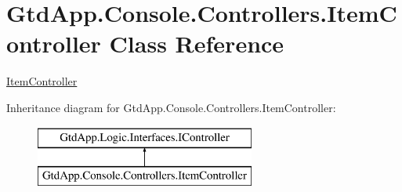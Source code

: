 \hypertarget{class_gtd_app_1_1_console_1_1_controllers_1_1_item_controller}{}\section{Gtd\+App.\+Console.\+Controllers.\+Item\+Controller Class Reference}
\label{class_gtd_app_1_1_console_1_1_controllers_1_1_item_controller}


\mbox{\hyperlink{class_gtd_app_1_1_console_1_1_controllers_1_1_item_controller}{Item\+Controller}}  


Inheritance diagram for Gtd\+App.\+Console.\+Controllers.\+Item\+Controller\+:\begin{figure}[H]
\begin{center}
\leavevmode
\includegraphics[height=2.000000cm]{class_gtd_app_1_1_console_1_1_controllers_1_1_item_controller}
\end{center}
\end{figure}
